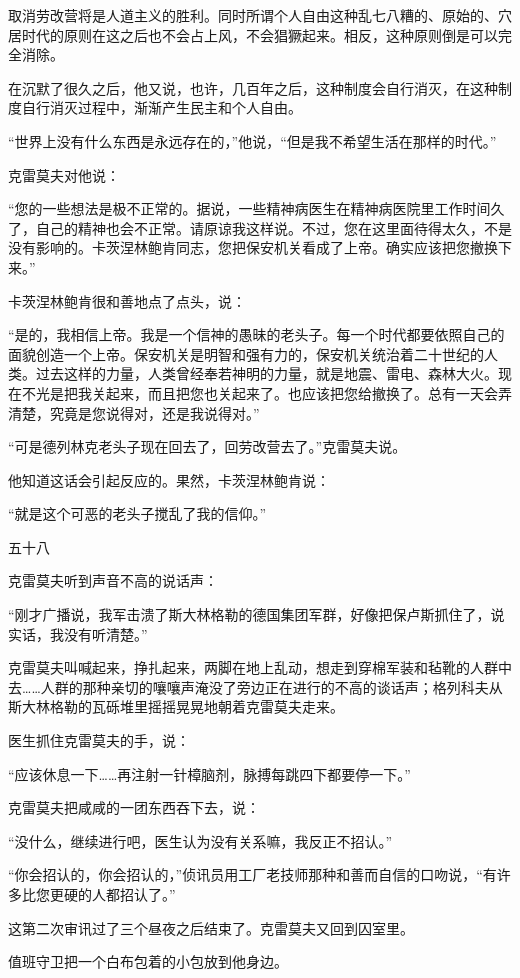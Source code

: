取消劳改营将是人道主义的胜利。同时所谓个人自由这种乱七八糟的、原始的、穴居时代的原则在这之后也不会占上风，不会猖獗起来。相反，这种原则倒是可以完全消除。

在沉默了很久之后，他又说，也许，几百年之后，这种制度会自行消灭，在这种制度自行消灭过程中，渐渐产生民主和个人自由。

“世界上没有什么东西是永远存在的，”他说，“但是我不希望生活在那样的时代。”

克雷莫夫对他说：

“您的一些想法是极不正常的。据说，一些精神病医生在精神病医院里工作时间久了，自己的精神也会不正常。请原谅我这样说。不过，您在这里面待得太久，不是没有影响的。卡茨涅林鲍肯同志，您把保安机关看成了上帝。确实应该把您撤换下来。”

卡茨涅林鲍肯很和善地点了点头，说：

“是的，我相信上帝。我是一个信神的愚昧的老头子。每一个时代都要依照自己的面貌创造一个上帝。保安机关是明智和强有力的，保安机关统治着二十世纪的人类。过去这样的力量，人类曾经奉若神明的力量，就是地震、雷电、森林大火。现在不光是把我关起来，而且把您也关起来了。也应该把您给撤换了。总有一天会弄清楚，究竟是您说得对，还是我说得对。”

“可是德列林克老头子现在回去了，回劳改营去了。”克雷莫夫说。

他知道这话会引起反应的。果然，卡茨涅林鲍肯说：

“就是这个可恶的老头子搅乱了我的信仰。”

五十八

克雷莫夫听到声音不高的说话声：

“刚才广播说，我军击溃了斯大林格勒的德国集团军群，好像把保卢斯抓住了，说实话，我没有听清楚。”

克雷莫夫叫喊起来，挣扎起来，两脚在地上乱动，想走到穿棉军装和毡靴的人群中去……人群的那种亲切的嚷嚷声淹没了旁边正在进行的不高的谈话声；格列科夫从斯大林格勒的瓦砾堆里摇摇晃晃地朝着克雷莫夫走来。

医生抓住克雷莫夫的手，说：

“应该休息一下……再注射一针樟脑剂，脉搏每跳四下都要停一下。”

克雷莫夫把咸咸的一团东西吞下去，说：

“没什么，继续进行吧，医生认为没有关系嘛，我反正不招认。”

“你会招认的，你会招认的，”侦讯员用工厂老技师那种和善而自信的口吻说，“有许多比您更硬的人都招认了。”

这第二次审讯过了三个昼夜之后结束了。克雷莫夫又回到囚室里。

值班守卫把一个白布包着的小包放到他身边。

